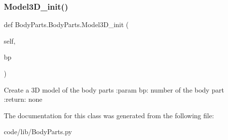 \subsubsection{\texorpdfstring{Model3\+D\+\_\+init()}{Model3D\_init()}}
{\footnotesize\ttfamily def Body\+Parts.\+Body\+Parts.\+Model3\+D\+\_\+init (\begin{DoxyParamCaption}\item[{}]{self,  }\item[{}]{bp }\end{DoxyParamCaption})}

\begin{DoxyVerb}Create a 3D model of the body parts
:param bp: number of the body part
:return:  none
\end{DoxyVerb}
 

The documentation for this class was generated from the following file\+:\begin{DoxyCompactItemize}
\item 
code/lib/Body\+Parts.\+py\end{DoxyCompactItemize}
